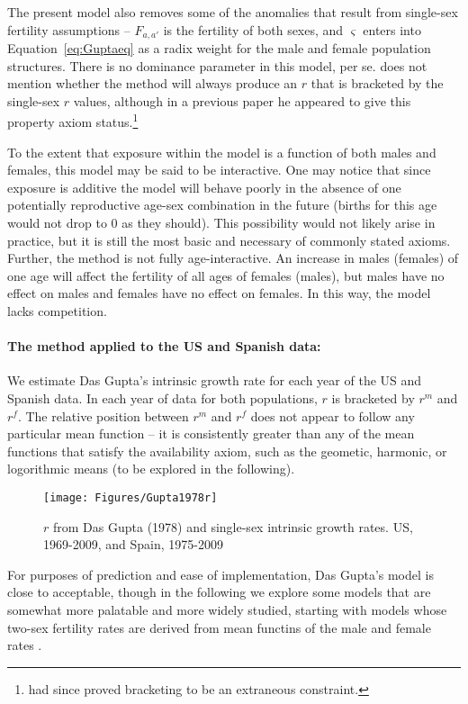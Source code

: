 The present model also removes some of the anomalies that
result from single-sex fertility assumptions -- $F_{a,a'}$ is the fertility of
both sexes, and $\varsigma$ enters into Equation~\eqref{eq:Guptaeq} as a radix
weight for the male and female population structures. There is no dominance
parameter in this model, per se. \citet{gupta1978alternative} does not mention
whether the method will always produce an $r$ that is bracketed by the
single-sex $r$ values, although in a previous paper
\citep{gupta1976interactive} he appeared to give this property axiom
status.\footnote{\citet{yellin1977comparison} had since proved bracketing to be
an extraneous constraint.}
 
 To the extent that exposure within the model is a function of both males and
 females, this model may be said to be interactive. One may notice that since
 exposure is additive the model will behave poorly in the absence of one
 potentially reproductive age-sex combination in the future (births for this
 age would not drop to 0 as they should). This possibility would not likely
 arise in practice, but it is still the most basic and necessary of
 commonly stated axioms. Further, the method is not fully age-interactive. An
 increase in males (females) of one age will affect the fertility of all ages of
 females (males), but males have no effect on males and females have no effect
 on females. In this way, the model lacks competition.

\paragraph{The method applied to the US and Spanish data: } We estimate Das
Gupta's intrinsic growth rate for each year of the US and Spanish data. In each
year of data for both populations, $r$ is bracketed by $r^m$ and $r^f$. The
relative position between $r^m$ and $r^f$ does not appear to follow any
particular mean function -- it is consistently greater than any of the mean
functions that satisfy the availability axiom, such as the geometic, harmonic,
or logorithmic means (to be explored in the following).

\begin{figure}[ht!]
        \centering  
          \caption{$r$ from Das Gupta (1978) and single-sex intrinsic growth rates. US, 1969-2009, and Spain, 1975-2009}
           \texttt{[image: Figures/Gupta1978r]}
          \label{fig:Gupta1978r}
\end{figure}

For purposes of prediction and ease of implementation, Das Gupta's model is
close to acceptable, though in the following we explore some models that
are somewhat more palatable and more widely studied, starting with models whose
two-sex fertility rates are derived from mean functins of the male
and female rates \citep{schoen1981harmonic}.

\FloatBarrier
